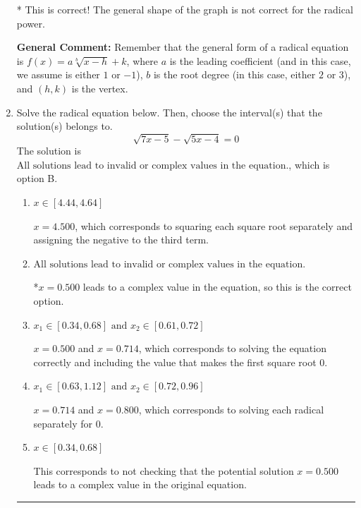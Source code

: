 \documentclass{extbook}[14pt]
\newcommand{\litem}[1]{\item #1

\rule{\textwidth}{0.4pt}}
\begin{document}
\begin{enumerate}
{\begin{enumerate}[label=\Alph*.]
* This is correct! The general shape of the graph is not correct for the radical power.
\end{enumerate}

\textbf{General Comment:} Remember that the general form of a radical equation is $ f(x) = a \sqrt[b]{x - h} + k$, where $a$ is the leading coefficient (and in this case, we assume is either $1$ or $-1$), $b$ is the root degree (in this case, either $2$ or $3$), and $(h, k)$ is the vertex.
}
\litem{
Solve the radical equation below. Then, choose the interval(s) that the solution(s) belongs to.
\[ \sqrt{7 x - 5} - \sqrt{5 x - 4} = 0 \]The solution is \( \text{All solutions lead to invalid or complex values in the equation.} \), which is option B.\begin{enumerate}[label=\Alph*.]
\item \( x \in [4.44,4.64] \)

$x = 4.500$, which corresponds to squaring each square root separately and assigning the negative to the third term.
\item \( \text{All solutions lead to invalid or complex values in the equation.} \)

*$x = 0.500$ leads to a complex value in the equation, so this is the correct option.
\item \( x_1 \in [0.34, 0.68] \text{ and } x_2 \in [0.61,0.72] \)

$x = 0.500$ and $x = 0.714$, which corresponds to solving the equation correctly and including the value that makes the first square root 0.
\item \( x_1 \in [0.63, 1.12] \text{ and } x_2 \in [0.72,0.96] \)

$x = 0.714$ and $x = 0.800$, which corresponds to solving each radical separately for 0.
\item \( x \in [0.34,0.68] \)

This corresponds to not checking that the potential solution $x = 0.500$ leads to a complex value in the original equation.
\end{enumerate}

}
\end{enumerate}
\end{document}
